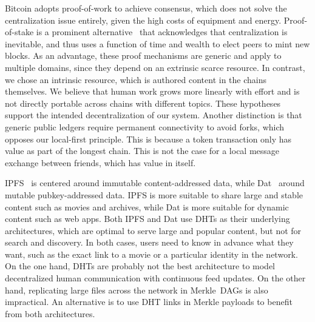 \documentclass[12pt]{article}
\begin{document}
Bitcoin adopts proof-of-work to achieve consensus, which does not solve the
centralization issue entirely, given the high costs of equipment and energy.
Proof-of-stake is a prominent alternative~\cite{p2p.proofs} that acknowledges
that centralization is inevitable, and thus uses a function of time and wealth
to elect peers to mint new blocks.
As an advantage, these proof mechanisms are generic and apply to multiple
domains, since they depend on an extrinsic scarce resource.
In contrast, we chose an intrinsic resource, which is authored content in the
chains themselves.
We believe that human work grows more linearly with effort and is not directly
portable across chains with different topics.
These hypotheses support the intended decentralization of our system.
%
Another distinction is that generic public ledgers require permanent
connectivity to avoid forks, which opposes our local-first principle.
This is because a token transaction only has value as part of the longest
chain.
This is not the case for a local message exchange between friends, which has
value in itself.

IPFS~\cite{p2p.ipfs} is centered around immutable content-addressed data, while
Dat~\cite{p2p.dat} around mutable pubkey-addressed data.
IPFS is more suitable to share large and stable content such as movies and
archives, while Dat is more suitable for dynamic content such as web apps.
%
Both IPFS and Dat use DHTs as their underlying architectures, which are optimal
to serve large and popular content, but not for search and discovery.
In both cases, users need to know in advance what they want, such as the exact
link to a movie or a particular identity in the network.
%
On the one hand, DHTs are probably not the best architecture to model
decentralized human communication with continuous feed updates.
On the other hand, replicating large files across the network in Merkle~DAGs is
also impractical.
An alternative is to use DHT links in Merkle payloads to benefit from both
architectures.
\end{document}
